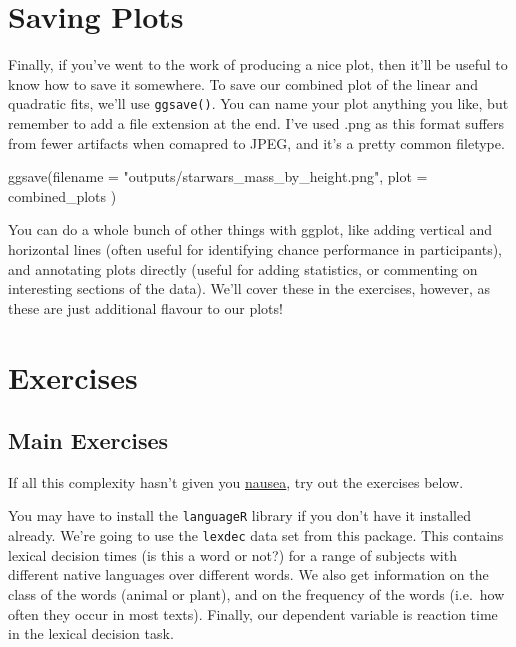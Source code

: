 \documentclass[
]{book}
\newenvironment{Shaded}{\begin{snugshade}}{\end{snugshade}}
\newcommand{\AttributeTok}[1]{\textcolor[rgb]{0.77,0.63,0.00}{#1}}
\newcommand{\FunctionTok}[1]{\textcolor[rgb]{0.00,0.00,0.00}{#1}}
\newcommand{\NormalTok}[1]{#1}
\newcommand{\StringTok}[1]{\textcolor[rgb]{0.31,0.60,0.02}{#1}}
\begin{document}
\hypertarget{saving-plots}{%
\section{Saving Plots}\label{saving-plots}}

Finally, if you've went to the work of producing a nice plot, then it'll be useful to know how to save it somewhere. To save our combined plot of the linear and quadratic fits, we'll use \texttt{ggsave()}. You can name your plot anything you like, but remember to add a file extension at the end. I've used .png as this format suffers from fewer artifacts when comapred to JPEG, and it's a pretty common filetype.

\begin{Shaded}
\begin{Highlighting}[]
\FunctionTok{ggsave}\NormalTok{(}\AttributeTok{filename =} \StringTok{"outputs/starwars\_mass\_by\_height.png"}\NormalTok{, }
       \AttributeTok{plot =}\NormalTok{ combined\_plots}
\NormalTok{       )}
\end{Highlighting}
\end{Shaded}

You can do a whole bunch of other things with ggplot, like adding vertical and horizontal lines (often useful for identifying chance performance in participants), and annotating plots directly (useful for adding statistics, or commenting on interesting sections of the data). We'll cover these in the exercises, however, as these are just additional flavour to our plots!

\hypertarget{exercises-2}{%
\section{Exercises}\label{exercises-2}}

\hypertarget{main-exercises-1}{%
\subsection{Main Exercises}\label{main-exercises-1}}

If all this complexity hasn't given you \href{https://youtu.be/JidJV1ue1lI}{nausea}, try out the exercises below.

You may have to install the \texttt{languageR} library if you don't have it installed already. We're going to use the \texttt{lexdec} data set from this package. This contains lexical decision times (is this a word or not?) for a range of subjects with different native languages over different words. We also get information on the class of the words (animal or plant), and on the frequency of the words (i.e.~how often they occur in most texts). Finally, our dependent variable is reaction time in the lexical decision task.
\end{document}

